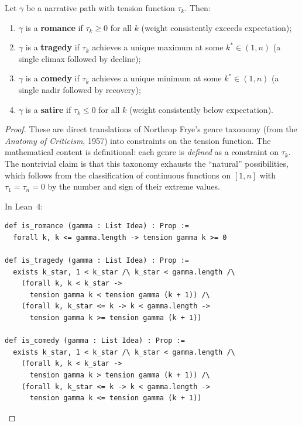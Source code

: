 \begin{theorem}
\label{thm:genre-classification}
Let $\gamma$ be a narrative path with tension function $\tau_k$.  Then:
\begin{enumerate}
\item $\gamma$ is a \textbf{romance} if $\tau_k \geq 0$ for all $k$ (weight
consistently exceeds expectation);
\item $\gamma$ is a \textbf{tragedy} if $\tau_k$ achieves a unique maximum
at some $k^* \in (1, n)$ (a single climax followed by decline);
\item $\gamma$ is a \textbf{comedy} if $\tau_k$ achieves a unique minimum
at some $k^* \in (1, n)$ (a single nadir followed by recovery);
\item $\gamma$ is a \textbf{satire} if $\tau_k \leq 0$ for all $k$ (weight
consistently below expectation).
\end{enumerate}
\end{theorem}

\begin{proof}
These are direct translations of Northrop Frye's genre taxonomy (from the
\textit{Anatomy of Criticism}, 1957) into constraints on the tension function.
The mathematical content is definitional: each genre is \emph{defined} as a
constraint on $\tau_k$.  The nontrivial claim is that this taxonomy exhausts
the ``natural'' possibilities, which follows from the classification of
continuous functions on $[1, n]$ with $\tau_1 = \tau_n = 0$ by the number
and sign of their extreme values.

In Lean~4:
\begin{lstlisting}
def is_romance (gamma : List Idea) : Prop :=
  forall k, k <= gamma.length -> tension gamma k >= 0

def is_tragedy (gamma : List Idea) : Prop :=
  exists k_star, 1 < k_star /\ k_star < gamma.length /\
    (forall k, k < k_star ->
      tension gamma k < tension gamma (k + 1)) /\
    (forall k, k_star <= k -> k < gamma.length ->
      tension gamma k >= tension gamma (k + 1))

def is_comedy (gamma : List Idea) : Prop :=
  exists k_star, 1 < k_star /\ k_star < gamma.length /\
    (forall k, k < k_star ->
      tension gamma k > tension gamma (k + 1)) /\
    (forall k, k_star <= k -> k < gamma.length ->
      tension gamma k <= tension gamma (k + 1))
\end{lstlisting}
\end{proof}

